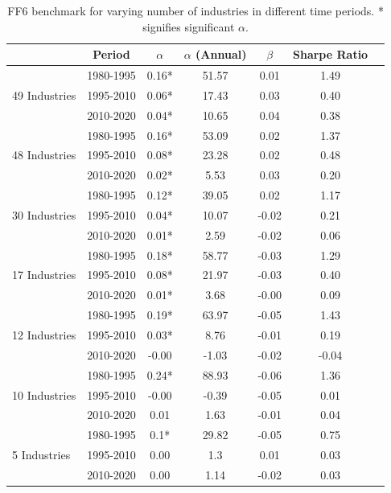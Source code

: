 \documentclass{article}
\begin{document}
\begin{table}[H]
    \centering
    \begin{tabular}{lcccccc}
        \toprule
        & Period & $\alpha$ & $\alpha$ (Annual) & $\beta$ & Sharpe Ratio \\
        \midrule
        \multirow{3}{*}{49 Industries} & 1980-1995 & 0.16* & 51.57 & 0.01 & 1.49 \\
                                       & 1995-2010 & 0.06* & 17.43 & 0.03 & 0.40 \\
                                       & 2010-2020 & 0.04* & 10.65 & 0.04 & 0.38 \\
        \midrule
        \multirow{3}{*}{48 Industries} & 1980-1995 & 0.16* & 53.09 & 0.02 & 1.37 \\
                                       & 1995-2010 & 0.08* & 23.28 & 0.02 & 0.48 \\
                                       & 2010-2020 & 0.02* & 5.53 & 0.03 & 0.20 \\
        \midrule
        \multirow{3}{*}{30 Industries} & 1980-1995 & 0.12* & 39.05 & 0.02 & 1.17 \\
                                       & 1995-2010 & 0.04* & 10.07 & -0.02 & 0.21 \\
                                       & 2010-2020 & 0.01* & 2.59 & -0.02 & 0.06 \\
        \midrule
        \multirow{3}{*}{17 Industries} & 1980-1995 & 0.18* & 58.77 & -0.03 & 1.29 \\
                                       & 1995-2010 & 0.08* & 21.97 & -0.03 & 0.40 \\
                                       & 2010-2020 & 0.01* & 3.68 & -0.00 & 0.09 \\
        \midrule
        \multirow{3}{*}{12 Industries} & 1980-1995 & 0.19* & 63.97 & -0.05 & 1.43 \\
                                       & 1995-2010 & 0.03* & 8.76 & -0.01 & 0.19 \\
                                       & 2010-2020 & -0.00 & -1.03 & -0.02 & -0.04 \\
        \midrule
        \multirow{3}{*}{10 Industries} & 1980-1995 & 0.24* & 88.93 & -0.06 & 1.36 \\
                                       & 1995-2010 & -0.00 & -0.39 & -0.05 & 0.01 \\
                                       & 2010-2020 & 0.01 & 1.63 & -0.01 & 0.04 \\
        \midrule
        \multirow{3}{*}{5 Industries}  & 1980-1995 & 0.1* & 29.82 & -0.05 & 0.75 \\
                                       & 1995-2010 & 0.00 & 1.3 & 0.01 & 0.03 \\
                                       & 2010-2020 & 0.00 & 1.14 & -0.02 & 0.03 \\
        \bottomrule
    \end{tabular}
    \caption{FF6 benchmark for varying number of industries in different time periods. * signifies significant $\alpha$.}
    \label{tab:number_of_industries_comparison}
\end{table}
\end{document}
